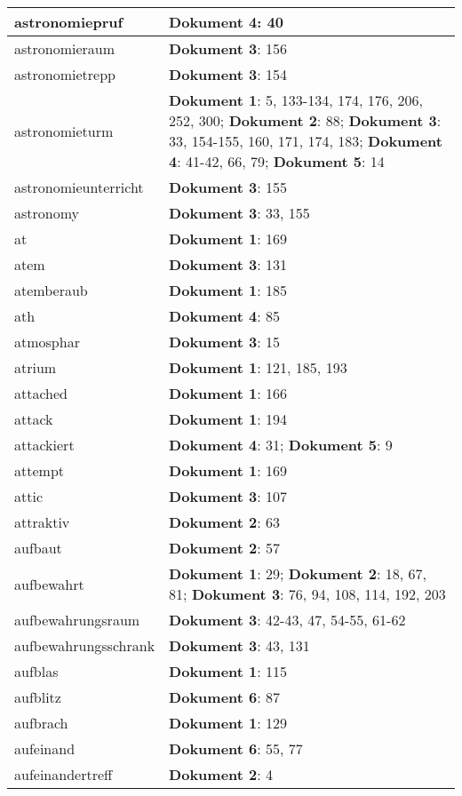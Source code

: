 \documentclass[a5paper]{article}
\begin{document}
\begin{longtable}[l]{|l|p{3in}|}
astronomiepruf & \textbf{Dokument 4}: 40 \\
\hline
astronomieraum & \textbf{Dokument 3}: 156 \\
\hline
astronomietrepp & \textbf{Dokument 3}: 154 \\
\hline
astronomieturm & \textbf{Dokument 1}: 5, 133-134, 174, 176, 206, 252, 300; \textbf{Dokument 2}: 88; \textbf{Dokument 3}: 33, 154-155, 160, 171, 174, 183; \textbf{Dokument 4}: 41-42, 66, 79; \textbf{Dokument 5}: 14 \\
\hline
astronomieunterricht & \textbf{Dokument 3}: 155 \\
\hline
astronomy & \textbf{Dokument 3}: 33, 155 \\
\hline
at & \textbf{Dokument 1}: 169 \\
\hline
atem & \textbf{Dokument 3}: 131 \\
\hline
atemberaub & \textbf{Dokument 1}: 185 \\
\hline
ath & \textbf{Dokument 4}: 85 \\
\hline
atmosphar & \textbf{Dokument 3}: 15 \\
\hline
atrium & \textbf{Dokument 1}: 121, 185, 193 \\
\hline
attached & \textbf{Dokument 1}: 166 \\
\hline
attack & \textbf{Dokument 1}: 194 \\
\hline
attackiert & \textbf{Dokument 4}: 31; \textbf{Dokument 5}: 9 \\
\hline
attempt & \textbf{Dokument 1}: 169 \\
\hline
attic & \textbf{Dokument 3}: 107 \\
\hline
attraktiv & \textbf{Dokument 2}: 63 \\
\hline
aufbaut & \textbf{Dokument 2}: 57 \\
\hline
aufbewahrt & \textbf{Dokument 1}: 29; \textbf{Dokument 2}: 18, 67, 81; \textbf{Dokument 3}: 76, 94, 108, 114, 192, 203 \\
\hline
aufbewahrungsraum & \textbf{Dokument 3}: 42-43, 47, 54-55, 61-62 \\
\hline
aufbewahrungsschrank & \textbf{Dokument 3}: 43, 131 \\
\hline
aufblas & \textbf{Dokument 1}: 115 \\
\hline
aufblitz & \textbf{Dokument 6}: 87 \\
\hline
aufbrach & \textbf{Dokument 1}: 129 \\
\hline
aufeinand & \textbf{Dokument 6}: 55, 77 \\
\hline
aufeinandertreff & \textbf{Dokument 2}: 4 \\

\end{longtable}
\end{document}

